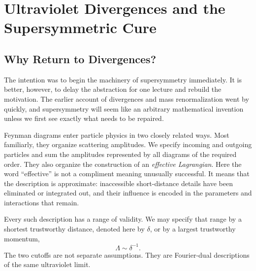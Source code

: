 \chapter{Ultraviolet Divergences and the Supersymmetric Cure}


\section{Why Return to Divergences?}

The intention was to begin the machinery of supersymmetry immediately. It is better, however, to delay the abstraction for one lecture and rebuild the motivation. The earlier account of divergences and mass renormalization went by quickly, and supersymmetry will seem like an arbitrary mathematical invention unless we first see exactly what needs to be repaired.

Feynman diagrams enter particle physics in two closely related ways. Most familiarly, they organize scattering amplitudes. We specify incoming and outgoing particles and sum the amplitudes represented by all diagrams of the required order. They also organize the construction of an \emph{effective Lagrangian}. Here the word ``effective'' is not a compliment meaning unusually successful. It means that the description is approximate: inaccessible short-distance details have been eliminated or integrated out, and their influence is encoded in the parameters and interactions that remain.

Every such description has a range of validity. We may specify that range by a shortest trustworthy distance, denoted here by \(\delta\), or by a largest trustworthy momentum,
\begin{equation}
\Lambda\sim \delta^{-1}.
\end{equation}
The two cutoffs are not separate assumptions. They are Fourier-dual descriptions of the same ultraviolet limit.

